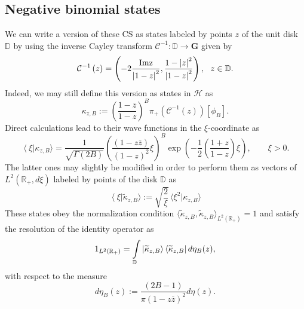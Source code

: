 \subsection{Negative binomial states}

\smallskip We can write a version of these CS as states labeled by points $z$
of the unit disk $\mathbb{D}$ by using the inverse Cayley transform $%
\mathcal{C}^{-1}:\mathbb{D}\rightarrow \mathbf{G}$ given by 
\begin{equation}
\label{r14}
\mathcal{C}^{-1}\left( z\right) =\left( -2\frac{\rm{Im}z}{\left\vert
1-z\right\vert ^{2}},\frac{1-\left\vert z\right\vert ^{2}}{\left\vert
1-z\right\vert ^{2}}\right) ,\text{ \ }z\in \mathbb{D}.  
\end{equation}
Indeed, we may still define this version as states in $\mathcal{H}$ as%
\begin{equation}
\label{r15}
\kappa _{z,B}:=\left( \frac{1-\bar{z}}{1-z}\right) ^{B}\pi _{+}\left( 
\mathcal{C}^{-1}\left( z\right) \right) \left[ \phi _{B}\right] . 
\end{equation}
Direct calculations lead to their wave functions in the $\xi $-coordinate as 
\begin{equation}
\label{r16}
\left\langle \xi \right\vert \kappa _{z,B}\rangle =\frac{1}{\sqrt{\Gamma
\left( 2B\right) }}\left( \frac{\left( 1-z\bar{z}\right) }{\left( 1-z\right)
^{2}}\xi \right) ^{B}\exp \left( -\frac{1}{2}\left( \frac{1+z}{1-z}\right)
\xi \right) ,\qquad \xi >0.  
\end{equation}
The latter ones may slightly be modified in order to perform them as vectors
of $L^{2}(\mathbb{R}_{+},d\xi )$ labeled by points of the disk $\mathbb{D}$
as 
\begin{equation}
\label{r17}
\left\langle \xi \right\vert \widetilde{\kappa }_{z,B}\rangle :=\sqrt{\frac{2%
}{\xi }}\,\langle \xi ^{2}|\kappa _{z,B}\rangle  
\end{equation}
These states obey the normalization condition $\langle \widetilde{\kappa }%
_{z,B},\widetilde{\kappa }_{z,B}\rangle _{L^{2}(\mathbb{R}_{+})}=1$ and
satisfy the resolution of the identity operator as 
\begin{equation}
\label{r18}
1_{L^{2}(\mathbb{R}_{+})}=\int\limits_{\mathbb{D}}\left\vert \widetilde{%
\kappa }_{z,B}\right\rangle \left\langle \widetilde{\kappa }%
_{z,B}\right\vert d\eta _{B}(z),  
\end{equation}
with respect to the measure 
\begin{equation}
\label{r19}
d\eta _{B}(z):=\frac{(2B-1)}{\pi \left( 1-z\overline{z}\right) ^{2}}d\eta
(z).  
\end{equation}


